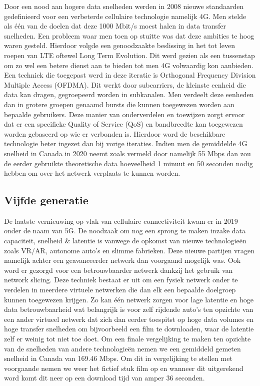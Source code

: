 Door een nood aan hogere data snelheden werden in 2008 nieuwe standaarden gedefinieerd voor een verbeterde cellulaire technologie namelijk 4G. Men stelde als één van de doelen dat deze 1000 Mbit/s moest halen in data transfer snelheden. Een probleem waar men toen op stuitte was dat deze ambities te hoog waren gesteld. Hierdoor volgde een genoodzaakte beslissing in het tot leven roepen van LTE oftewel Long Term Evolution. Dit werd gezien als een tussenstap om zo wel een betere dienst aan te bieden tot men 4G volwaardig kon aanbieden. \autocite{Nicholls2022} Een techniek die toegepast werd in deze iteratie is Orthogonal Frequency Division Multiple Access (OFDMA). Dit werkt door subcarriers, de kleinste eenheid die data kan dragen, gegroepeerd worden in subkanalen. Men verdeelt deze eenheden dan in grotere groepen genaamd bursts die kunnen toegewezen worden aan bepaalde gebruikers. Deze manier van onderverdelen en toewijzen zorgt ervoor dat er een specifieke Quality of Service (QoS) en bandbreedte kan toegewezen worden gebaseerd op wie er verbonden is. Hierdoor word de beschikbare technologie beter ingezet dan bij vorige iteraties. \autocite{Friedmann2007} Indien men de gemiddelde 4G snelheid in Canada in 2020 neemt zoals vermeld door \textcite{Galazzo2020} namelijk 55 Mbps dan zou de eerder gebruikte theoretische data hoeveelheid 1 minuut en 50 seconden nodig hebben om over het netwerk verplaats te kunnen worden. \autocite{Wooding2024}

\subsection{Vijfde generatie}

De laatste vernieuwing op vlak van cellulaire connectiviteit kwam er in 2019 onder de naam van 5G. De noodzaak om nog een sprong te maken inzake data capaciteit, snelheid \& latentie is vanwege de opkomst van nieuwe technologieën zoals VR/AR, autonome auto's en slimme fabrieken. Deze nieuwe partijen vragen namelijk achter een geavanceerder netwerk dan voorgaand mogelijk was. Ook word er gezorgd voor een betrouwbaarder netwerk dankzij het gebruik van network slicing. Deze techniek bestaat er uit om een fysiek netwerk onder te verdelen in meerdere virtuele netwerken die dan elk een bepaalde doelgroep kunnen toegewezen krijgen. Zo kan één netwerk zorgen voor lage latentie en hoge data betrouwbaarheid wat belangrijk is voor zelf rijdende auto's ten opzichte van een ander virtueel netwerk dat zich dan eerder toespitst op hoge data volumes en hoge transfer snelheden om bijvoorbeeld een film te downloaden, waar de latentie zelf er weinig tot niet toe doet. \autocite{Flinders2024} Om een finale vergelijking te maken ten opzichte van de snelheden van andere technologieën nemen we een gemiddeld gemeten snelheid in Canada van 169.46 Mbps. \autocite{Galazzo2020} Om dit in vergelijking te stellen met voorgaande nemen we weer het fictief stuk film op en wanneer dit uitgerekend word komt dit neer op een download tijd van amper 36 seconden. \autocite{Wooding2024}

